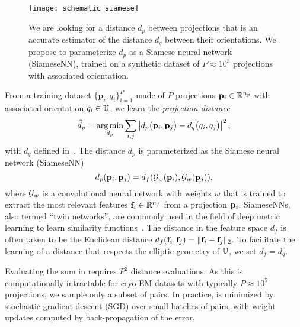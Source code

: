 \begin{figure}
    \centering
    \texttt{[image: schematic\_siamese]}
    \caption{
        We are looking for a distance $d_p$ between projections that is an accurate estimator of the distance $d_q$ between their orientations.
        We propose to parameterize $d_p$ as a Siamese neural network (SiameseNN), trained on a synthetic dataset of $P \approx 10^3$ projections with associated orientation.
}
    \label{fig:schematic:distance-learning}
\end{figure}

From a training dataset $\{ \mathbf{p}_{i}, q_i\}_{i=1}^{P}$ made of $P$ projections $\mathbf{p}_i \in \mathbb{R}^{n_p}$ with associated orientation $q_i \in \mathbb{U}$, we learn the \textit{projection distance}
\begin{equation}
    \widehat{d}_p = \operatorname*{arg\,min}_{d_p} \sum_{i,j} \left| d_p\big(\mathbf{p}_{i},\mathbf{p}_{j}\big) - d_q\big(q_i,q_j\big) \right|^2,
    \label{eqn:distance-learning}
\end{equation}
with $d_q$ defined in~.
The distance $d_p$ is parameterized as the Siamese neural network (SiameseNN)~\cite{chopra2005learning}
\begin{equation}
    d_p(\mathbf{p}_i, \mathbf{p}_j) = d_f(\mathcal{G}_w(\mathbf{p}_i), \mathcal{G}_w(\mathbf{p}_j)),
    \label{eqn:distance:projections}
\end{equation}
where $\mathcal{G}_w$ is a convolutional neural network with weights $w$ that is trained to extract the most relevant features $\mathbf{f}_i \in \mathbb{R}^{n_f}$ from a projection $\mathbf{p}_i$. SiameseNNs, also termed ``twin networks'', are commonly used in the field of deep metric learning to learn similarity functions~\cite{yi2014deep}. 
The distance in the feature space $d_f$ is often taken to be the Euclidean distance $d_f(\mathbf{f}_i, \mathbf{f}_j) = \Vert \mathbf{f}_i - \mathbf{f}_j \Vert_2$.
To facilitate the learning of a distance that respects the elliptic geometry of $\mathbb{U}$, we set $d_f = d_q$.


Evaluating the sum in  requires $P^2$ distance evaluations.
As this is computationally intractable for cryo-EM datasets with typically $P \approx 10^5$ projections, we sample only a subset of pairs.
In practice,  is minimized by stochastic gradient descent (SGD) over small batches of pairs, with weight updates computed by back-propagation of the error.

